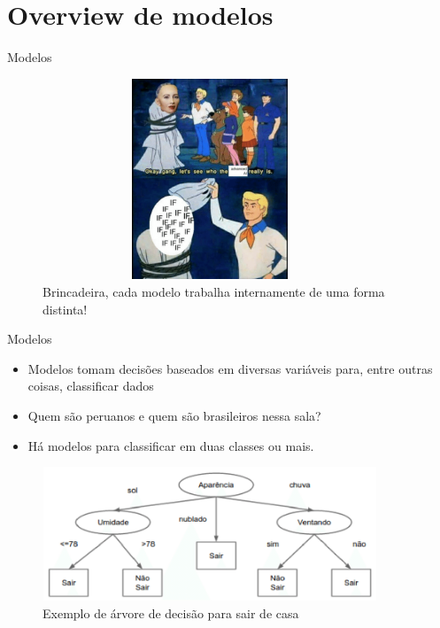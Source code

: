 \section{Overview de modelos}

\begin{frame}	
	\begin{block}{Modelos}	
			\begin{figure}[!htb]
			\centering	  				
			\includegraphics[height=6cm, width = 10cm]{./pic/AI.png}
			\caption{Brincadeira, cada modelo trabalha internamente de uma forma distinta!}
			\label{fig_brincadeira}
		\end{figure}	
	\end{block}
\end{frame}

\begin{frame}	
	\begin{block}{Modelos}	
		\begin{itemize}
			\item Modelos tomam decisões baseados em diversas variáveis para, entre outras coisas, classificar dados
			\item Quem são peruanos e quem são brasileiros nessa sala?
			\item Há modelos para classificar em duas classes ou mais.
		\end{itemize}			
		\begin{figure}[!htb]
			\centering	  				
			\includegraphics[height=4cm, width = 10cm]{./pic/arvore.png}
			\caption{Exemplo de árvore de decisão para sair de casa}
			\label{fig_Arvore}
		\end{figure}	
	\end{block}
\end{frame}